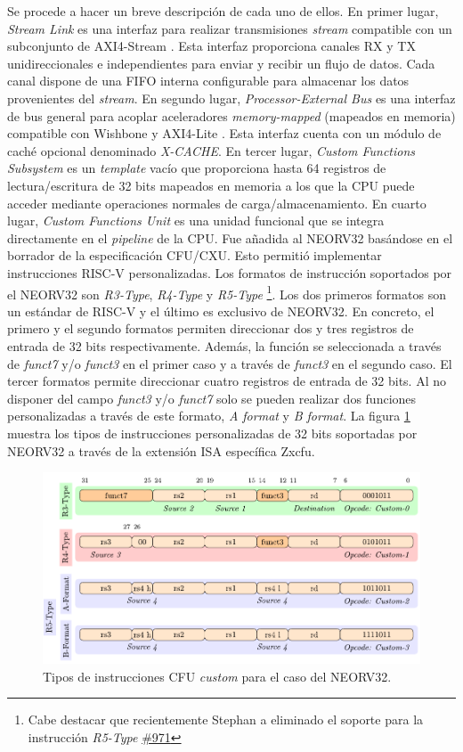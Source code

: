 Se procede a hacer un breve descripción de cada uno de ellos.
En primer lugar, \textit{Stream Link} es una interfaz para realizar transmisiones \textit{stream} compatible con un subconjunto de AXI4-Stream \cite{axi}.
Esta interfaz proporciona canales RX y TX unidireccionales e independientes para enviar y recibir un flujo de datos.
Cada canal dispone de una FIFO interna configurable para almacenar los datos provenientes del \textit{stream}.
En segundo lugar, \textit{Processor-External Bus} es una interfaz de bus general para acoplar aceleradores \textit{memory-mapped} (mapeados en memoria) compatible con Wishbone \cite{wb} y AXI4-Lite \cite{axi-lite}.
Esta interfaz cuenta con un módulo de caché opcional denominado \textit{X-CACHE}.
En tercer lugar, \textit{Custom Functions Subsystem} es un \textit{template} vacío que proporciona hasta 64 registros de lectura/escritura de 32 bits mapeados en memoria a los que la CPU puede acceder mediante operaciones normales de carga/almacenamiento.
En cuarto lugar, \textit{Custom Functions Unit} es una unidad funcional que se integra directamente en el \textit{pipeline} de la CPU.
Fue añadida al NEORV32 basándose en el borrador de la especificación CFU/CXU.
Esto permitió implementar instrucciones RISC-V personalizadas. 
Los formatos de instrucción soportados por el NEORV32 son \textit{R3-Type}, \textit{R4-Type} y \textit{R5-Type} \footnote{Cabe destacar que recientemente Stephan a eliminado el soporte para la instrucción \textit{R5-Type} \href{https://github.com/stnolting/neorv32/pull/971}{\#971}}.
Los dos primeros formatos son un estándar de RISC-V y el último es exclusivo de NEORV32. 
En concreto, el primero y el segundo formatos permiten direccionar dos y tres registros de entrada de 32 bits respectivamente. 
Además, la función se seleccionada a través de \textit{funct7} y/o \textit{funct3} en el primer caso y a través de \textit{funct3} en el segundo caso. 
El tercer formatos permite direccionar cuatro registros de entrada de 32 bits. 
Al no disponer del campo \textit{funct3} y/o \textit{funct7} solo se pueden realizar dos funciones personalizadas a través de este formato, \textit{A format} y \textit{B format}.  
La figura \ref{fig:ins} muestra los tipos de instrucciones personalizadas de 32 bits soportadas por NEORV32 a través de la extensión ISA específica Zxcfu.

\begin{figure}[h!]
    \centering
    \includegraphics[width=14cm]{Figuras/CFU_INS.pdf}
    \caption{Tipos de instrucciones CFU \textit{custom} para el caso del NEORV32.}
    \label{fig:ins}
\end{figure}

